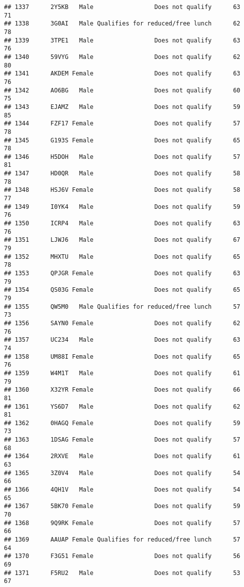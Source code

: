 \documentclass[
]{article}
\begin{document}
\begin{verbatim}
## 1337      2Y5KB   Male                 Does not qualify      63       71
## 1338      3G0AI   Male Qualifies for reduced/free lunch      62       78
## 1339      3TPE1   Male                 Does not qualify      63       76
## 1340      59VYG   Male                 Does not qualify      62       80
## 1341      AKDEM Female                 Does not qualify      63       76
## 1342      AO6BG   Male                 Does not qualify      60       75
## 1343      EJAMZ   Male                 Does not qualify      59       85
## 1344      FZF17 Female                 Does not qualify      57       78
## 1345      G193S Female                 Does not qualify      65       78
## 1346      H5DOH   Male                 Does not qualify      57       81
## 1347      HD0QR   Male                 Does not qualify      58       78
## 1348      HSJ6V Female                 Does not qualify      58       77
## 1349      I0YK4   Male                 Does not qualify      59       76
## 1350      ICRP4   Male                 Does not qualify      63       76
## 1351      LJWJ6   Male                 Does not qualify      67       79
## 1352      MHXTU   Male                 Does not qualify      65       78
## 1353      QPJGR Female                 Does not qualify      63       79
## 1354      QS03G Female                 Does not qualify      65       79
## 1355      QW5M0   Male Qualifies for reduced/free lunch      57       73
## 1356      SAYN0 Female                 Does not qualify      62       76
## 1357      UC234   Male                 Does not qualify      63       74
## 1358      UM88I Female                 Does not qualify      65       76
## 1359      W4M1T   Male                 Does not qualify      61       79
## 1360      X32YR Female                 Does not qualify      66       81
## 1361      YS6D7   Male                 Does not qualify      62       81
## 1362      0HAGQ Female                 Does not qualify      59       73
## 1363      1DSAG Female                 Does not qualify      57       68
## 1364      2RXVE   Male                 Does not qualify      61       63
## 1365      3Z0V4   Male                 Does not qualify      54       66
## 1366      4QH1V   Male                 Does not qualify      54       65
## 1367      5BK70 Female                 Does not qualify      59       70
## 1368      9Q9RK Female                 Does not qualify      57       66
## 1369      AAUAP Female Qualifies for reduced/free lunch      57       64
## 1370      F3G51 Female                 Does not qualify      56       69
## 1371      F5RU2   Male                 Does not qualify      53       67

\end{verbatim}
\end{document}
